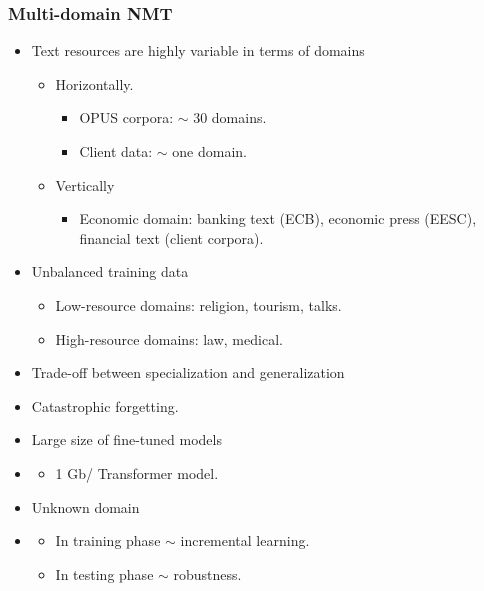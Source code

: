 \documentclass{beamer}
\begin{document}
\begin{frame}
\frametitle{Multi-domain NMT}
\centering
\begin{itemize}
	\item<1-> Text resources are highly variable in terms of domains
	\begin{itemize}
		\item<2-> Horizontally.
		\begin{itemize}
			\item<3-> OPUS corpora: $\sim$ 30 domains.
			\item<4-> Client data: $\sim$ one domain.
		\end{itemize}
		\item<5-> Vertically
		\begin{itemize}
			\item<6-> Economic domain: banking text (ECB), economic press (EESC), financial text (client corpora).
		\end{itemize}
	\end{itemize}
	\item<7-> Unbalanced training data
	\begin{itemize}
		\item<8-> Low-resource domains: religion, tourism, talks.
		\item<9-> High-resource domains: law, medical.
	\end{itemize}
	\item<10-> Trade-off between specialization and generalization
	\item<11-> Catastrophic forgetting. 
	\item<12-> Large size of fine-tuned models
	\item<13-> \begin{itemize}
		\item<14-> 1 Gb/ Transformer model.
		\end{itemize} 
	\item<15-> Unknown domain
	\item<16-> \begin{itemize}
		\item<17-> In training phase $\sim$ incremental learning.
		\item<18-> In testing phase $\sim$ robustness.
		\end{itemize}
\end{itemize}
\end{frame}
\end{document}
